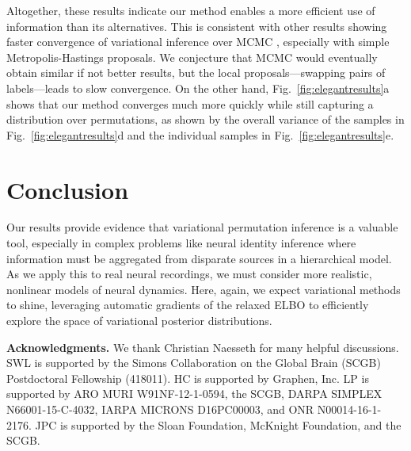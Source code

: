 \documentclass[twoside]{article}
\begin{document}
Altogether, these results indicate our method enables a more efficient
use of information than its alternatives. This is consistent with
other results showing faster convergence of variational inference over
MCMC \citep{Blei2017}, especially with simple Metropolis-Hastings
proposals. We conjecture that MCMC would eventually obtain similar if
not better results, but the local proposals---swapping pairs of
labels---leads to slow convergence. On the other hand,
Fig.~\ref{fig:elegantresults}a shows that our method converges much
more quickly while still capturing a distribution over permutations,
as shown by the overall variance of the samples in
Fig.~\ref{fig:elegantresults}d and the individual samples in
Fig.~\ref{fig:elegantresults}e.

\section{Conclusion}

Our results provide evidence that variational permutation
inference is a valuable tool, especially in complex
problems like neural identity inference where information must be
aggregated from disparate sources in a hierarchical model.  As we
apply this to real neural recordings, we must consider more realistic,
nonlinear models of neural dynamics. Here, again, we expect
variational methods to shine, leveraging automatic gradients of the
relaxed ELBO to efficiently explore the space of variational posterior
distributions.

{\small
\textbf{Acknowledgments.}
We thank Christian Naesseth for many helpful discussions.  SWL is
supported by the Simons Collaboration on the Global Brain (SCGB)
Postdoctoral Fellowship (418011).
HC is supported by Graphen, Inc.
LP is supported by ARO MURI
W91NF-12-1-0594, the SCGB, DARPA SIMPLEX N66001-15-C-4032, IARPA
MICRONS D16PC00003, and ONR N00014-16-1-2176.  JPC is supported by the
Sloan Foundation, McKnight Foundation, and the SCGB.
}





\clearpage
\appendix


\end{document}
